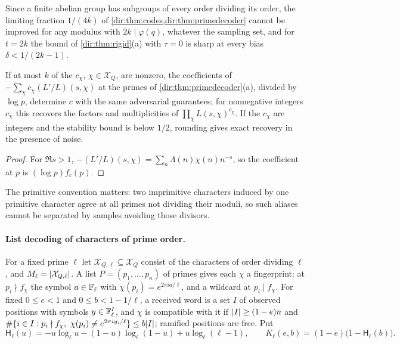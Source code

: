 Since a finite abelian group has subgroups of every order dividing its order, the limiting fraction
$1/(4k)$ of \cref{dir:thm:codes,dir:thm:primedecoder} cannot be improved for any modulus with
$2k\mid\varphi(q)$, whatever the sampling set, and for $t=2k$ the bound of \cref{dir:thm:rigid}(a) with
$\tau=0$ is sharp at every bias $\delta<1/(2k-1)$.

\begin{corollary}\label{dir:cor:packets}
If at most $k$ of the $c_\chi$, $\chi\in\mathcal X_Q$, are nonzero, the coefficients of
$-\sum_\chi c_\chi(L'/L)(s,\chi)$ at the primes of \cref{dir:thm:primedecoder}(a), divided by $\log p$, determine
$c$ with the same adversarial guarantees; for nonnegative integers $c_\chi$ this recovers the factors and
multiplicities of $\prod_\chi L(s,\chi)^{c_\chi}$. If the $c_\chi$ are integers and the stability bound is below
$1/2$, rounding gives exact recovery in the presence of noise.
\end{corollary}

\begin{proof}
For $\Re s>1$, $-(L'/L)(s,\chi)=\sum_n\Lambda(n)\chi(n)n^{-s}$, so the coefficient at $p$ is $(\log p)f_c(p)$.
\end{proof}

The primitive convention matters: two imprimitive characters induced by one primitive character agree
at all primes not dividing their moduli, so such aliases cannot be separated by samples avoiding those
divisors.

\paragraph{List decoding of characters of prime order.}
For a fixed prime $\ell$ let $\mathcal X_{Q,\ell}\subseteq\mathcal X_Q$ consist of the characters of order dividing
$\ell$, and $M_\ell=\lvert\mathcal X_{Q,\ell}\rvert$. A list $P=(p_1,\dots,p_n)$ of primes gives each $\chi$ a fingerprint:
at $p_i\nmid f_\chi$ the symbol $a\in\mathbb{F}_\ell$ with $\chi(p_i)=e^{2\pi ia/\ell}$, and a wildcard at $p_i\mid f_\chi$. For
fixed $0\le e<1$ and $0\le b<1-1/\ell$, a received word is a set $I$ of observed positions with symbols
$y\in\mathbb{F}_\ell^I$, and $\chi$ is compatible with it if $\lvert I\rvert\ge(1-e)n$ and
$\#\{i\in I:p_i\nmid f_\chi,\ \chi(p_i)\ne e^{2\pi iy_i/\ell}\}\le b\lvert I\rvert$; ramified positions are free. Put
\[
 \mathsf H_\ell(u)=-u\log_\ell u-(1-u)\log_\ell(1-u)+u\log_\ell(\ell-1),\qquad
 K_\ell(e,b)=(1-e)\bigl(1-\mathsf H_\ell(b)\bigr).
\]

